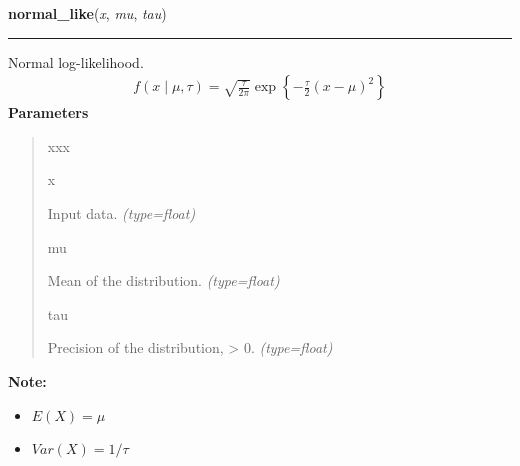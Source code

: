 \hspace{.8\funcindent}\begin{boxedminipage}{\funcwidth}

    \raggedright \textbf{normal\_like}(\textit{x}, \textit{mu}, \textit{tau})

    \vspace{-1.5ex}

    \rule{\textwidth}{0.5\fboxrule}
\setlength{\parskip}{2ex}

Normal log-likelihood.
\begin{equation*}\begin{split}f(x \mid \mu, \tau) = \sqrt{\frac{\tau}{2\pi}} \exp\left\{ -\frac{\tau}{2} (x-\mu)^2 \right\}\end{split}\end{equation*}\setlength{\parskip}{1ex}
      \textbf{Parameters}
      \vspace{-1ex}

      \begin{quote}
        \begin{Ventry}{xxx}

          \item[x]


Input data.
            {\it (type=float)}

          \item[mu]


Mean of the distribution.
            {\it (type=float)}

          \item[tau]


Precision of the distribution, {\textgreater} 0.
            {\it (type=float)}

        \end{Ventry}

      \end{quote}

\textbf{Note:} \begin{itemize}
\item {} 
$E(X) = \mu$

\item {} 
$Var(X) = 1/\tau$

\end{itemize}


    \end{boxedminipage}

    \label{pymc:distributions:one_over_x_like}

